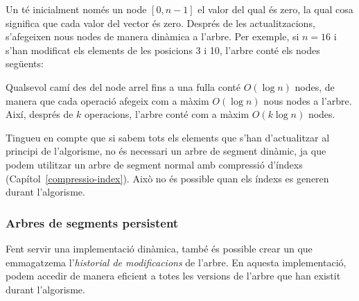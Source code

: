 Un  té inicialment només un node
$[0,n-1]$ el valor del qual és zero, la qual cosa significa que cada
valor del vector és zero. Després de les actualitzacions, s'afegeixen
nous nodes de manera dinàmica a l'arbre. Per exemple, si $n=16$ i
s'han modificat els elements de les posicions 3 i 10, l'arbre conté
els nodes següents:
\begin{center}
\end{center}


Qualsevol camí des del node arrel fins a una fulla conté $O(\log n)$
nodes, de manera que cada operació afegeix com a màxim $O(\log n)$
nous nodes a l'arbre. Així, després de $k$ operacions, l'arbre conté
com a màxim $O(k \log n)$ nodes.

Tingueu en compte que si sabem tots els elements que s'han
d'actualitzar al principi de l'algorisme, no és necessari un arbre de
segment dinàmic, ja que podem utilitzar un arbre de segment normal amb
compressió d'índexs (Capítol~\ref{compressio-index}). Això no és
possible quan els índexs es generen durant l'algorisme.

\subsubsection{Arbres de segments persistent}


Fent servir una implementació dinàmica, també és possible crear un
 que emmagatzema l'\emph{historial
de modificacions} de l'arbre. En aquesta implementació, podem accedir
de manera eficient a totes les versions de l'arbre que han existit
durant l'algorisme.

